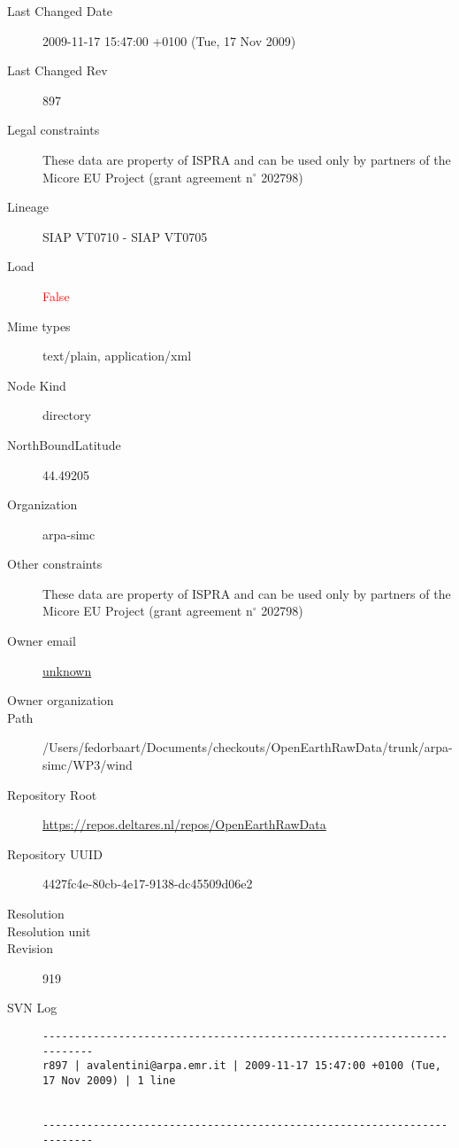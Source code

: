 \documentclass[9]{report}
\begin{document}
\begin{description}
  \item[Last Changed Date] 2009-11-17 15:47:00 +0100 (Tue, 17 Nov 2009)
  \item[Last Changed Rev] 897
  \item[Legal constraints] These data are property of ISPRA and can be used only by partners of the Micore EU Project (grant agreement n\mbox{$^\circ$} 202798)
  \item[Lineage] SIAP VT0710 - SIAP VT0705
  \item[Load] \textcolor{red}{False}
  \item[Mime types] text/plain, application/xml
  \item[Node Kind] directory
  \item[NorthBoundLatitude] 44.49205
  \item[Organization] arpa-simc
  \item[Other constraints] These data are property of ISPRA and can be used only by partners of the Micore EU Project (grant agreement n\mbox{$^\circ$} 202798)
  \item[Owner email] \href{mailto:unknown}{unknown}
  \item[Owner organization] 
  \item[Path] /Users/fedorbaart/Documents/checkouts/OpenEarthRawData/trunk/arpa-simc/WP3/wind
  \item[Repository Root] \href{https://repos.deltares.nl/repos/OpenEarthRawData}{https://repos.deltares.nl/repos/OpenEarthRawData}
  \item[Repository UUID] 4427fc4e-80cb-4e17-9138-dc45509d06e2
  \item[Resolution] 
  \item[Resolution unit] 
  \item[Revision] 919
  \item[SVN Log] \begin{verbatim}
------------------------------------------------------------------------
r897 | avalentini@arpa.emr.it | 2009-11-17 15:47:00 +0100 (Tue, 17 Nov 2009) | 1 line


------------------------------------------------------------------------


\end{verbatim}
\end{description}
\end{document}

